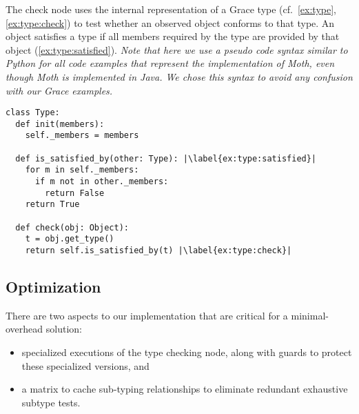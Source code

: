 
%

The check node uses the internal representation of a Grace type
(cf.\ \cref{ex:type}, \cref{ex:type:check}) to test whether an observed
object conforms to that type. 
An object satisfies a type if all members required by the type are provided
by that object (\cref{ex:type:satisfied}).
\emph{Note that here we use a pseudo code syntax similar to Python for all code examples
that represent the implementation of Moth, even though Moth is implemented in Java.
We chose this syntax to avoid any confusion with our Grace examples.}

\begin{lstlisting}[label={ex:type},escapechar=|,%
  caption={Sketch of a \code{Type} in our system and its \code{check()} semantics.},%
  float,floatplacement=htb,columns=flexible,float,floatplacement=H,morekeywords={not}]
class Type:
  def init(members):
    self._members = members

  def is_satisfied_by(other: Type): |\label{ex:type:satisfied}|
    for m in self._members:
      if m not in other._members:
        return False
    return True

  def check(obj: Object):
    t = obj.get_type()
    return self.is_satisfied_by(t) |\label{ex:type:check}|
\end{lstlisting}


\subsection{Optimization}
\label{ssec:optimization}

There are two aspects to our implementation that are critical for a minimal-overhead solution:

\begin{itemize}
  \item specialized executions of the type checking node, along with guards to protect these specialized versions, and
  \item a matrix to cache sub-typing relationships to eliminate
    redundant exhaustive subtype tests.
\end{itemize}
 

